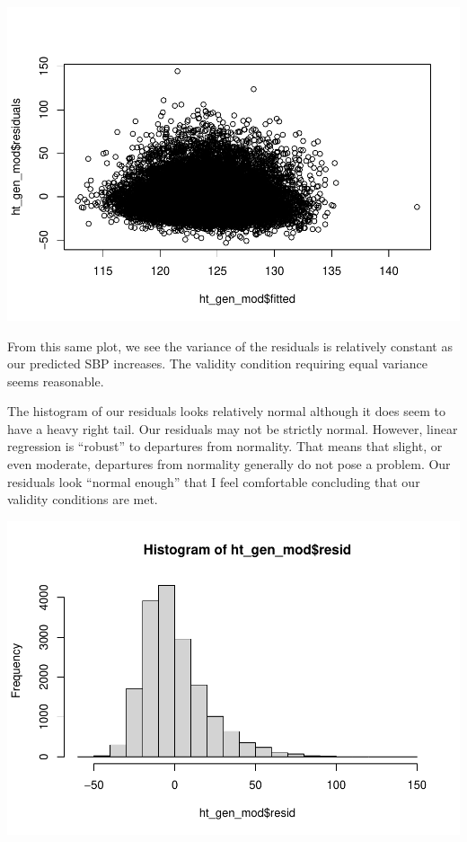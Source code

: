 \documentclass[]{book}
\newenvironment{Shaded}{\begin{snugshade}}{\end{snugshade}}
\newcommand{\KeywordTok}[1]{\textcolor[rgb]{0.13,0.29,0.53}{\textbf{#1}}}
\newcommand{\NormalTok}[1]{#1}
\newcommand{\OperatorTok}[1]{\textcolor[rgb]{0.81,0.36,0.00}{\textbf{#1}}}
\begin{document}
\includegraphics{MA206supplement_files/figure-latex/unnamed-chunk-8-1.pdf}

From this same plot, we see the variance of the residuals is relatively constant as our predicted SBP increases. The validity condition requiring equal variance seems reasonable.

The histogram of our residuals looks relatively normal although it does seem to have a heavy right tail. Our residuals may not be strictly normal. However, linear regression is ``robust'' to departures from normality. That means that slight, or even moderate, departures from normality generally do not pose a problem. Our residuals look ``normal enough'' that I feel comfortable concluding that our validity conditions are met.

\begin{Shaded}
\end{Shaded}

\includegraphics{MA206supplement_files/figure-latex/unnamed-chunk-9-1.pdf}
\end{document}
